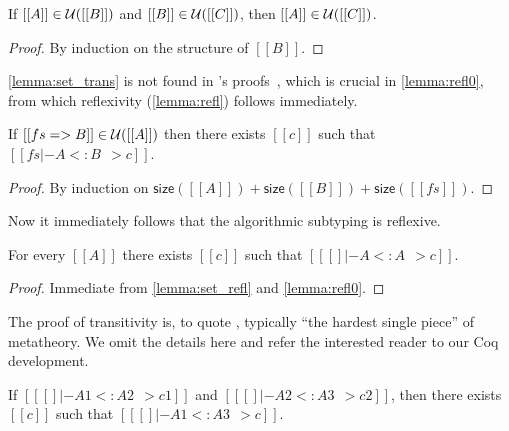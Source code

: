 \begin{lemma} \label{lemma:set_trans}
  If $[[A]] \in \mathcal{U}([[B]])$ and $[[B]] \in \mathcal{U}([[C]])$, then $[[A]] \in \mathcal{U}([[C]])$.
\end{lemma}
\begin{proof}
  By induction on the structure of $[[B]]$.
\end{proof}

\begin{remark}
  \cref{lemma:set_trans} is not found in \citeauthor{pierce1989decision}'s proofs~\citep{pierce1989decision}, which is
  crucial in \cref{lemma:refl0}, from which reflexivity (\cref{lemma:refl})
  follows immediately.
\end{remark}


\begin{lemma} \label{lemma:refl0}
  If $[[fs => B]] \in \mathcal{U}([[A]])$ then there exists $[[c]]$ such that $[[fs |- A <: B ~~> c]]$.
\end{lemma}
\begin{proof}
  By induction on $\mathsf{size}([[A]]) + \mathsf{size}([[B]]) + \mathsf{size}([[fs]])$.
\end{proof}

Now it immediately follows that the algorithmic subtyping is reflexive.

\begin{lemma}[Reflexivity] \label{lemma:refl}
  For every $[[A]]$ there exists $[[c]]$ such that $[[ [] |- A <: A ~~> c]]$.
\end{lemma}
\begin{proof}
  Immediate from \cref{lemma:set_refl} and \cref{lemma:refl0}.
\end{proof}

The proof of transitivity is, to quote \citet{pierce1989decision}, typically
``the hardest single piece'' of metatheory. We omit the details here and
refer the interested reader to our Coq development.

\begin{lemma}[Transitivity] \label{lemma:trans}
  If $[[ [] |- A1 <: A2 ~~> c1]]$ and $[[ [] |- A2 <: A3 ~~> c2]]$, then there
  exists $[[c]]$ such that $[[ [] |- A1 <: A3 ~~> c]]$.
\end{lemma}

